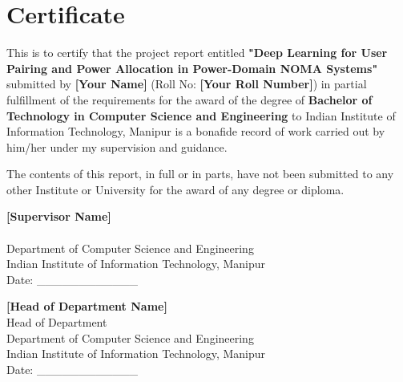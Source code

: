 \chapter*{Certificate}

\vspace{1cm}

This is to certify that the project report entitled \textbf{"Deep Learning for User Pairing and Power Allocation in Power-Domain NOMA Systems"} submitted by \textbf{[Your Name]} (Roll No: \textbf{[Your Roll Number]}) in partial fulfillment of the requirements for the award of the degree of \textbf{Bachelor of Technology in Computer Science and Engineering} to Indian Institute of Information Technology, Manipur is a bonafide record of work carried out by him/her under my supervision and guidance.

\vspace{1cm}

The contents of this report, in full or in parts, have not been submitted to any other Institute or University for the award of any degree or diploma.

\vspace{3cm}

\begin{flushleft}
\textbf{[Supervisor Name]} \\
[Designation] \\
Department of Computer Science and Engineering \\
Indian Institute of Information Technology, Manipur \\
Date: \_\_\_\_\_\_\_\_\_\_\_\_
\end{flushleft}

\vspace{2cm}

\begin{flushleft}
\textbf{[Head of Department Name]} \\
Head of Department \\
Department of Computer Science and Engineering \\
Indian Institute of Information Technology, Manipur \\
Date: \_\_\_\_\_\_\_\_\_\_\_\_
\end{flushleft}

\newpage
